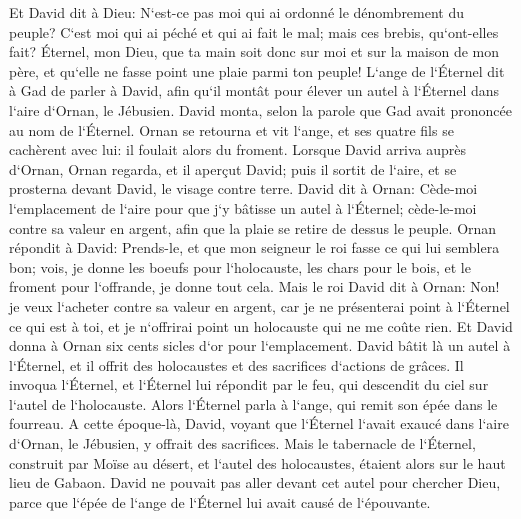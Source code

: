 \verse Et David dit à Dieu: N`est-ce pas moi qui ai ordonné le dénombrement du peuple? C`est moi qui ai péché et qui ai fait le mal; mais ces brebis, qu`ont-elles fait? Éternel, mon Dieu, que ta main soit donc sur moi et sur la maison de mon père, et qu`elle ne fasse point une plaie parmi ton peuple! 
\verse L`ange de l`Éternel dit à Gad de parler à David, afin qu`il montât pour élever un autel à l`Éternel dans l`aire d`Ornan, le Jébusien. 
\verse David monta, selon la parole que Gad avait prononcée au nom de l`Éternel. 
\verse Ornan se retourna et vit l`ange, et ses quatre fils se cachèrent avec lui: il foulait alors du froment. 
\verse Lorsque David arriva auprès d`Ornan, Ornan regarda, et il aperçut David; puis il sortit de l`aire, et se prosterna devant David, le visage contre terre. 
\verse David dit à Ornan: Cède-moi l`emplacement de l`aire pour que j`y bâtisse un autel à l`Éternel; cède-le-moi contre sa valeur en argent, afin que la plaie se retire de dessus le peuple. 
\verse Ornan répondit à David: Prends-le, et que mon seigneur le roi fasse ce qui lui semblera bon; vois, je donne les boeufs pour l`holocauste, les chars pour le bois, et le froment pour l`offrande, je donne tout cela. 
\verse Mais le roi David dit à Ornan: Non! je veux l`acheter contre sa valeur en argent, car je ne présenterai point à l`Éternel ce qui est à toi, et je n`offrirai point un holocauste qui ne me coûte rien. 
\verse Et David donna à Ornan six cents sicles d`or pour l`emplacement. 
\verse David bâtit là un autel à l`Éternel, et il offrit des holocaustes et des sacrifices d`actions de grâces. Il invoqua l`Éternel, et l`Éternel lui répondit par le feu, qui descendit du ciel sur l`autel de l`holocauste. 
\verse Alors l`Éternel parla à l`ange, qui remit son épée dans le fourreau. 
\verse A cette époque-là, David, voyant que l`Éternel l`avait exaucé dans l`aire d`Ornan, le Jébusien, y offrait des sacrifices. 
\verse Mais le tabernacle de l`Éternel, construit par Moïse au désert, et l`autel des holocaustes, étaient alors sur le haut lieu de Gabaon. 
\verse David ne pouvait pas aller devant cet autel pour chercher Dieu, parce que l`épée de l`ange de l`Éternel lui avait causé de l`épouvante. 

